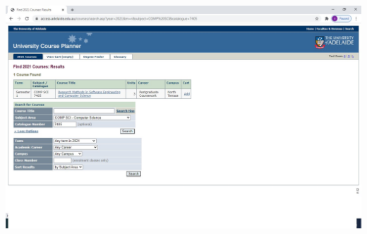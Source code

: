 \documentclass[a4 paper,12pt]{article}\usepackage{float, graphicx,xepersian }
\begin{document}
	\includegraphics[scale=0.5]{pic1.jpg}

                                                         
                                                     
                                                     
                                                     
                                                     
                                                     
\end{document}
